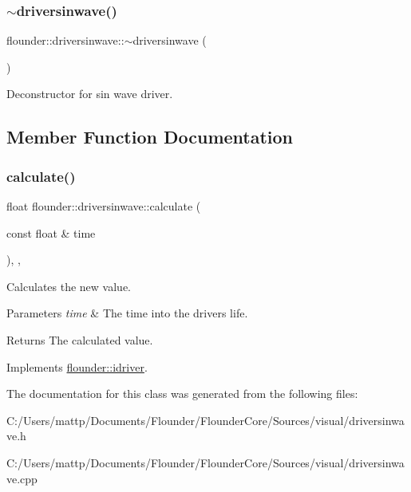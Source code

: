\subsubsection{\texorpdfstring{$\sim$driversinwave()}{~driversinwave()}}
{\footnotesize\ttfamily flounder\+::driversinwave\+::$\sim$driversinwave (\begin{DoxyParamCaption}{ }\end{DoxyParamCaption})}



Deconstructor for sin wave driver. 



\subsection{Member Function Documentation}
\mbox{\label{classflounder_1_1driversinwave_ae5c3d8d4bd38082ad2b0396029d45e66}} 
\subsubsection{\texorpdfstring{calculate()}{calculate()}}
{\footnotesize\ttfamily float flounder\+::driversinwave\+::calculate (\begin{DoxyParamCaption}\item[{const float \&}]{time }\end{DoxyParamCaption})\hspace{0.3cm}{\ttfamily [override]}, {\ttfamily [protected]}, {\ttfamily [virtual]}}



Calculates the new value. 


\begin{DoxyParams}{Parameters}
{\em time} & The time into the drivers life. \\
\hline
\end{DoxyParams}
\begin{DoxyReturn}{Returns}
The calculated value. 
\end{DoxyReturn}


Implements \hyperlink{classflounder_1_1idriver_a034c4159dc98c4c37ffdfaae64e4a16d}{flounder\+::idriver}.



The documentation for this class was generated from the following files\+:\begin{DoxyCompactItemize}
\item 
C\+:/\+Users/mattp/\+Documents/\+Flounder/\+Flounder\+Core/\+Sources/visual/driversinwave.\+h\item 
C\+:/\+Users/mattp/\+Documents/\+Flounder/\+Flounder\+Core/\+Sources/visual/driversinwave.\+cpp\end{DoxyCompactItemize}

